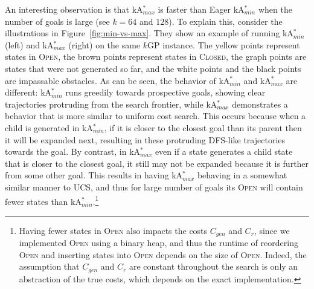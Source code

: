 \documentclass{aicom2e}
\newcommand{\kgs}{$k$GP}
\newcommand{\kastar}{kA$^*$}
\newcommand{\kastarmin}{kA$^*_{min}$}
\newcommand{\kastarmax}{kA$^*_{max}$}
\newcommand{\open}{\textsc{Open}}
\newcommand{\closed}{\textsc{Closed}}
\newcommand{\roni}[1]{\textbf{[RS:#1]}}
\begin{document}
An interesting observation is that \kastarmax{} is faster than Eager
\kastarmin{} when the number of goals is large (see $k=64$ and $128$). To
explain this, consider the illustrations in Figure~\ref{fig:min-vs-max}. They
show an example of running \kastarmin{} (left) and \kastarmax{} (right) on the
same \kgs{} instance. The yellow points represent states in \open{}, the brown
points represent states in \closed{}, the graph points are states that were not
generated so far, and the white points and the black points are impassable
obstacles. As can be seen, the behavior of \kastarmin{} and \kastarmax{} are
different: \kastarmin{} runs greedily towards prospective goals, showing clear
trajectories protruding from the search frontier, while \kastarmax{}
demonstrates a behavior that is more similar to uniform cost search. This
occurs  because when a child is generated in \kastarmin{}, if it is closer to
the closest goal than its parent then it will be expanded next, resulting in
these protruding DFS-like trajectories towards the goal. By contrast, in
\kastarmax{} even if a state generates a child state that is closer to the
closest goal, it still may not be expanded because it is further from some
other goal. This results in having \kastarmax{} behaving in a somewhat similar
manner to UCS, and thus for large number of goals its \open{} will contain
fewer states than \kastarmin{}.\footnote{Having fewer 
states in \open{} also impacts the costs $C_{gen}$ and $C_{r}$, since we implemented
\open{} using a binary heap, and thus the runtime of reordering \open{} and
inserting states into \open{} depends on the size of \open{}. Indeed, the
assumption that $C_{gen}$ and $C_r$ are constant throughout the search is only
an abstraction of the true costs, which depends on the exact implementation.}







\end{document}
